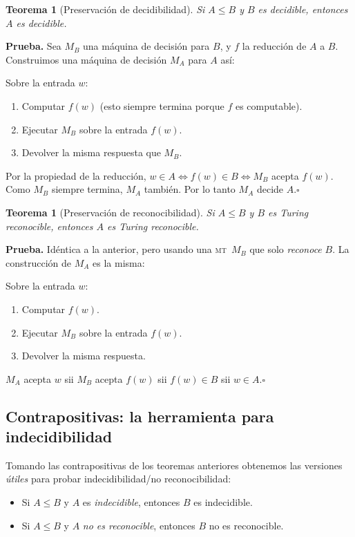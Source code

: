 \documentclass[11pt,a4paper]{article}
\theoremstyle{definicion}
\newtheorem{teorema}[definicion]{Teorema}
\newcommand{\MT}{\textsc{mt}}
\begin{document}
\begin{teorema}[Preservación de decidibilidad]
Si $A \leq B$ y $B$ es decidible, entonces $A$ es decidible.
\end{teorema}

\textbf{Prueba.} Sea $M_B$ una máquina de decisión para $B$, y $f$ la reducción de $A$ a $B$. Construimos una máquina de decisión $M_A$ para $A$ así:

Sobre la entrada $w$:
\begin{enumerate}
    \item Computar $f(w)$ (esto siempre termina porque $f$ es computable).
    \item Ejecutar $M_B$ sobre la entrada $f(w)$.
    \item Devolver la misma respuesta que $M_B$.
\end{enumerate}

Por la propiedad de la reducción, $w \in A \iff f(w) \in B \iff M_B$ acepta $f(w)$. Como $M_B$ siempre termina, $M_A$ también. Por lo tanto $M_A$ decide $A$.\hfill$\square$

\begin{teorema}[Preservación de reconocibilidad]
Si $A \leq B$ y $B$ es Turing reconocible, entonces $A$ es Turing reconocible.
\end{teorema}

\textbf{Prueba.} Idéntica a la anterior, pero usando una \MT\ $M_B$ que solo \emph{reconoce} $B$. La construcción de $M_A$ es la misma:

Sobre la entrada $w$:
\begin{enumerate}
    \item Computar $f(w)$.
    \item Ejecutar $M_B$ sobre la entrada $f(w)$.
    \item Devolver la misma respuesta.
\end{enumerate}

$M_A$ acepta $w$ sii $M_B$ acepta $f(w)$ sii $f(w) \in B$ sii $w \in A$.\hfill$\square$

\subsection{Contrapositivas: la herramienta para indecidibilidad}

Tomando las contrapositivas de los teoremas anteriores obtenemos las versiones \emph{útiles} para probar indecidibilidad/no reconocibilidad:

\begin{itemize}
    \item Si $A \leq B$ y $A$ es \emph{indecidible}, entonces $B$ es indecidible.
    \item Si $A \leq B$ y $A$ \emph{no es reconocible}, entonces $B$ no es reconocible.
\end{itemize}
\end{document}
